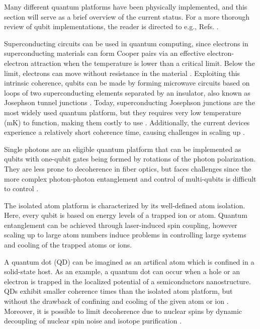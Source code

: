 
Many different quantum platforms have been physically implemented, and this section will serve as a brief overview of the current status. For a more thorough review of qubit implementations, the reader is directed to e.g., Refs. \cite{Ladd2010, Acin2018}.

Superconducting circuits can be used in quantum computing, since electrons in superconducting materials can form Cooper pairs via an effective electron-electron attraction when the temperature is lower than a critical limit. Below the limit, electrons can move without resistance in the material \cite{KristianFossheim2004}. Exploiting this intrinsic coherence, qubits can be made by forming microwave circuits based on loops of two superconducting elements separated by an insulator, also known as Josephson tunnel junctions \cite{Acin2018, Nakamura1999}. Today, superconducting Josephson junctions are the most widely used quantum platform, but they requires very low temperature (mK) to function, making them costly to use \cite{Acin2018}. Additionally, the current devices experience a relatively short coherence time, causing challenges in scaling up \cite{Acin2018}.

Single photons are an eligible quantum platform that can be implemented as qubits with one-qubit gates being formed by rotations of the photon polarization. They are less prone to decoherence in fiber optics, but faces challenges since the more complex photon-photon entanglement and control of multi-qubits is difficult to control \cite{Ladd2010}.


The isolated atom platform is characterized by its well-defined atom isolation. Here, every qubit is based on energy levels of a trapped ion or atom. Quantum entanglement can be achieved through laser-induced spin coupling, however scaling up to large atom numbers induce problems in controlling large systems and cooling of the trapped atoms or ions.

A quantum dot (QD) can be imagined as an artifical atom which is confined in a solid-state host. As an example, a quantum dot can occur when a hole or an electron is trapped in the localized potential of a semiconductors nanostructure. QDs exhibit smaller coherence times than the isolated atom platform, but without the drawback of confining and cooling of the given atom or ion \cite{Acin2018}. Moreover, it is possible to limit decoherence due to nuclear spins by dynamic decoupling of nuclear spin noise and isotope purification \cite{Ladd2010}.

